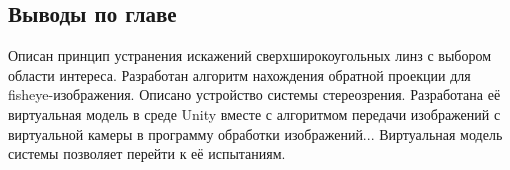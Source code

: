 \subsection{Выводы по главе}

Описан принцип устранения искажений сверхширокоугольных линз с выбором области интереса. Разработан алгоритм нахождения обратной 
проекции для fisheye-изображения. Описано устройство системы стереозрения. Разработана её виртуальная модель в среде Unity вместе с 
алгоритмом передачи изображений с виртуальной камеры в программу обработки изображений...   %
Виртуальная модель системы позволяет перейти к её испытаниям.